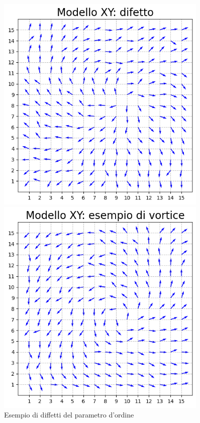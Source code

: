 \begin{figure}[H]
    \begin{minipage}{0.45\textwidth}  
      \centering
      \includegraphics[page=1, width=0.9\textwidth]{Immagini/simModelloXY/difetto3.png}
    \end{minipage}\hfill
    \begin{minipage}{0.45\textwidth}  
      \centering
      \includegraphics[page=1, width=0.9\textwidth]{Immagini/simModelloXY/conf_vortice.png}
    \end{minipage}
    \caption{Esempio di diffetti del parametro d'ordine}
    \vspace{12pt}
    
\end{figure}

\vspace*{\fill}